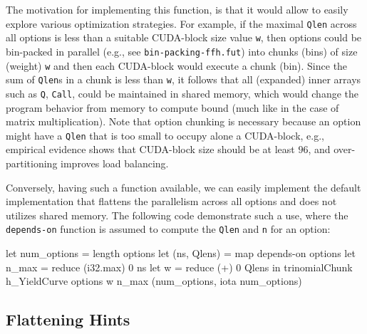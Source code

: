 \documentclass[a4paper,11pt]{article}
\begin{document}
The motivation for implementing this function, is that it would allow
to easily explore various optimization strategies. For example, if the
maximal {\tt Qlen} across all options is less than a suitable
CUDA-block size value {\tt w}, then options could be bin-packed 
in parallel (e.g., see {\tt bin-packing-ffh.fut}) into chunks
(bins) of size (weight) {\tt w} and then each CUDA-block would
execute a chunk (bin). Since the sum of {\tt Qlen}s in a chunk is 
less than {\tt w}, it follows that all (expanded) inner arrays such as 
{\tt Q}, {\tt Call}, could be maintained in shared memory, which
would change the program behavior from memory to compute bound
(much like in the case of matrix multiplication). 
Note that option chunking is necessary because an option might have
a {\tt Qlen} that is too small to occupy alone a CUDA-block, e.g.,
empirical evidence shows that CUDA-block size should be at least 
$96$, and over-partitioning improves load balancing. 

Conversely, having such a function available, we can easily implement
the default implementation that flattens the parallelism across all
options and does not utilizes shared memory.  The following code
demonstrate such a use, where the {\tt depends-on} function is assumed
to compute the {\tt Qlen} and {\tt n} for an option:

\begin{fancycode}
let num_options = length options
let (ns, Qlens) = map depends-on options
let n_max = reduce (i32.max) 0 ns
let w     = reduce (+) 0 Qlens
in  trinomialChunk h_YieldCurve options w n_max (num_options, iota num_options)
\end{fancycode}

\subsection{Flattening Hints}
\end{document}
